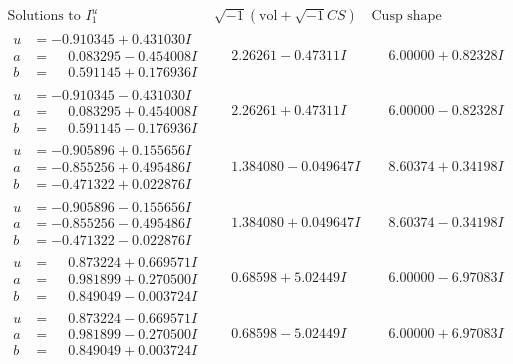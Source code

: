 \documentclass[1p]{elsarticle_modified}
\theoremstyle{definition}
\newcommand{\I}{\sqrt{-1}}
\begin{document}
$$\begin{array}{c|c|c}  
\text{Solutions to }I^u_{1}& \I (\text{vol} + \sqrt{-1}CS) & \text{Cusp shape}\\
 \hline 
\begin{aligned}
u &= -0.910345 + 0.431030 I \\
a &= \phantom{-}0.083295 - 0.454008 I \\
b &= \phantom{-}0.591145 + 0.176936 I\end{aligned}
 & \phantom{-}2.26261 - 0.47311 I & \phantom{-}6.00000 + 0.82328 I \\ \hline\begin{aligned}
u &= -0.910345 - 0.431030 I \\
a &= \phantom{-}0.083295 + 0.454008 I \\
b &= \phantom{-}0.591145 - 0.176936 I\end{aligned}
 & \phantom{-}2.26261 + 0.47311 I & \phantom{-}6.00000 - 0.82328 I \\ \hline\begin{aligned}
u &= -0.905896 + 0.155656 I \\
a &= -0.855256 + 0.495486 I \\
b &= -0.471322 + 0.022876 I\end{aligned}
 & \phantom{-}1.384080 - 0.049647 I & \phantom{-}8.60374 + 0.34198 I \\ \hline\begin{aligned}
u &= -0.905896 - 0.155656 I \\
a &= -0.855256 - 0.495486 I \\
b &= -0.471322 - 0.022876 I\end{aligned}
 & \phantom{-}1.384080 + 0.049647 I & \phantom{-}8.60374 - 0.34198 I \\ \hline\begin{aligned}
u &= \phantom{-}0.873224 + 0.669571 I \\
a &= \phantom{-}0.981899 + 0.270500 I \\
b &= \phantom{-}0.849049 - 0.003724 I\end{aligned}
 & \phantom{-}0.68598 + 5.02449 I & \phantom{-}6.00000 - 6.97083 I \\ \hline\begin{aligned}
u &= \phantom{-}0.873224 - 0.669571 I \\
a &= \phantom{-}0.981899 - 0.270500 I \\
b &= \phantom{-}0.849049 + 0.003724 I\end{aligned}
 & \phantom{-}0.68598 - 5.02449 I & \phantom{-}6.00000 + 6.97083 I \\ \hline\begin{aligned}

\end{aligned}
\end{array}$$
\end{document}

